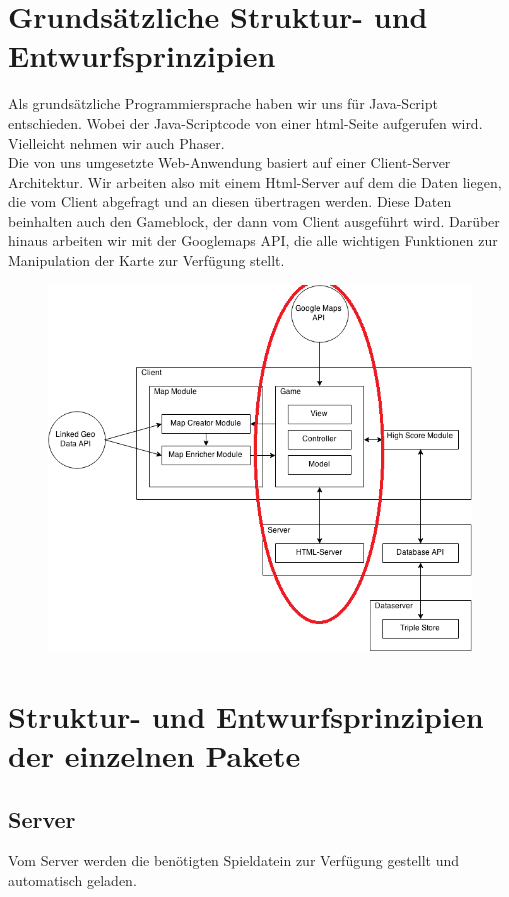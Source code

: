 \documentclass[11pt,a4paper]{article}
\begin{document}
\section{Grundsätzliche Struktur- und Entwurfsprinzipien}
Als grundsätzliche Programmiersprache haben wir uns für Java-Script entschieden. Wobei der Java-Scriptcode von einer html-Seite aufgerufen wird. Vielleicht nehmen  wir auch Phaser. \\
Die von uns umgesetzte Web-Anwendung basiert auf einer Client-Server Architektur. Wir arbeiten also mit einem Html-Server auf dem die Daten liegen, die vom Client abgefragt und an diesen übertragen werden. Diese Daten beinhalten auch den Gameblock, der dann vom Client ausgeführt wird. Darüber hinaus arbeiten wir mit der Googlemaps API, die alle wichtigen Funktionen zur Manipulation der Karte zur Verfügung stellt.\\
\begin{figure}[htb]
  \centering
  \includegraphics[scale=0.4]{arch.png}
  \label{PNFs}
\end{figure} 



\section{Struktur- und Entwurfsprinzipien der einzelnen Pakete}
\subsection{Server} Vom Server werden die benötigten Spieldatein zur Verfügung gestellt und automatisch geladen.
\end{document}
